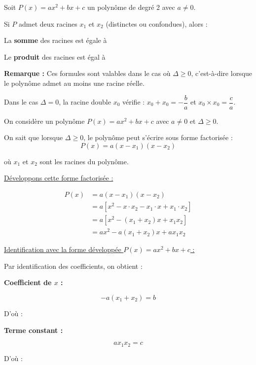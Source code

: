 \documentclass[a4paper,11pt,fleqn]{article}
\begin{document}
\begin{Propriete}
Soit $P(x) = ax^2 + bx + c$ un polynôme de degré 2 avec $a \neq 0$.

Si $P$ admet deux racines $x_1$ et $x_2$ (distinctes ou confondues), alors :

\begin{tcbenumerate}
\tcbitem La \textbf{somme} des racines est égale à 

\tcbitem Le \textbf{produit} des racines est égal à 
\end{tcbenumerate}

\vspace{0.3cm}
\noindent\textbf{Remarque :} Ces formules sont valables dans le cas où $\Delta \geq 0$, c'est-à-dire lorsque le polynôme admet au moins une racine réelle.

Dans le cas $\Delta = 0$, la racine double $x_0$ vérifie : $x_0 + x_0 = -\dfrac{b}{a}$ et $x_0 \times x_0 = \dfrac{c}{a}$.
\end{Propriete}

\begin{Demonstration}

On considère un polynôme $P(x) = ax^2 + bx + c$ avec $a \neq 0$ et $\Delta \geq 0$.

On sait que lorsque $\Delta \geq 0$, le polynôme peut s'écrire sous forme factorisée :
$$P(x) = a(x - x_1)(x - x_2)$$

où $x_1$ et $x_2$ sont les racines du polynôme.

\vspace{0.3cm}

\underline{Développons cette forme factorisée :}

\begin{align*}
P(x) &= a(x - x_1)(x - x_2) \\
&= a\left[x^2 - x \cdot x_2 - x_1 \cdot x + x_1 \cdot x_2\right] \\
&= a\left[x^2 - (x_1 + x_2)x + x_1 x_2\right] \\
&= ax^2 - a(x_1 + x_2)x + a x_1 x_2
\end{align*}

\vspace{0.3cm}

\underline{Identification avec la forme développée $P(x) = ax^2 + bx + c$ :}

Par identification des coefficients, on obtient :

\begin{MultiColonnes}{2}
\tcbitem \textbf{Coefficient de $x$ :}

$$-a(x_1 + x_2) = b$$

D'où : 

\tcbitem \textbf{Terme constant :}

$$a x_1 x_2 = c$$

D'où : 
\end{MultiColonnes}

\vspace{1cm}
\end{Demonstration}
\end{document}
